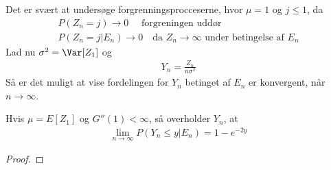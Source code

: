 Det er svært at undersøge forgrenningsprocceserne, hvor $\mu=1$ og $j\leq 1$, da
\begin{align}
    P(Z_n=j)\to 0 \quad \text{ forgreningen uddør}
    \\
    P(Z_n=j |E_n) \to 0 \quad \text{da } Z_n\to\infty \text{ under betingelse af } E_n 
\end{align}
Lad nu $\sigma^2=\Var[Z_1]$ og  
\begin{align*}
Y_n=\frac{Z_n}{n\sigma^2}    
\end{align*}
Så er det muligt at vise fordelingen for $Y_n$ betinget af $E_n$ er konvergent, når $n\to\infty$.  

\begin{thm} \label{thm:thm6.7.8grim}
Hvis $\mu=E[Z_1]$ og $G''(1)<\infty$, så overholder $Y_n$, at
\begin{align*}
    \lim_{n\to\infty}P(Y_n\leq y|E_n) = 1-e^{-2y}
\end{align*}
\end{thm} 
\begin{proof}

\end{proof}
















